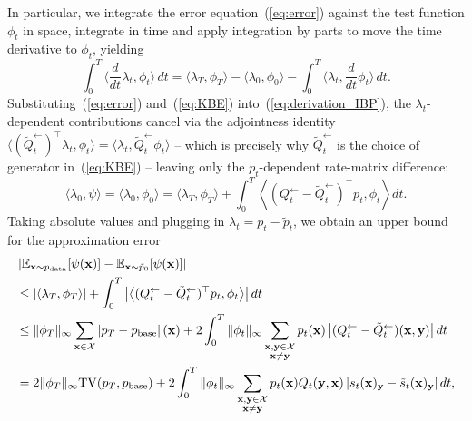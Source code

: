 \documentclass{article} %
\def\eqref#1{equation~\ref{#1}}
\newcommand{\bfx}{{\bf x}}
\newcommand{\bfy}{ {\bf y}}
\newcommand{\TV}{\mathrm{TV}}
\renewcommand{\eqref}[1]{\textup{(\ref{#1})}}
\begin{document}
In particular, we integrate the error equation~\eqref{eq:error} against the test function $\phi_t$ in space, integrate in time and apply integration by parts to move the time derivative to $\phi_t$, yielding
\begin{equation}\label{eq:derivation_IBP}
\int_0^T \langle \frac{d}{dt} \lambda_t, \phi_t \rangle \, dt = \langle \lambda_T, \phi_T \rangle - \langle \lambda_0, \phi_0 \rangle - \int_0^T \langle \lambda_t, \frac{d}{dt} \phi_t \rangle \, dt.
\end{equation}
Substituting~\eqref{eq:error} and~\eqref{eq:KBE} into~\eqref{eq:derivation_IBP}, the $\lambda_t$-dependent contributions cancel via the adjointness identity $\langle (\tilde{Q}_t^{\leftarrow})^\top \lambda_t, \phi_t \rangle = \langle \lambda_t, \tilde{Q}_t^{\leftarrow} \phi_t \rangle$ -- which is precisely why $\tilde{Q}_t^{\leftarrow}$ is the choice of generator in~\eqref{eq:KBE} -- leaving only the $p_t$-dependent rate-matrix difference:
\begin{equation}
     \langle \lambda_0, \psi \rangle = \langle \lambda_0, \phi_0 \rangle = \langle \lambda_T, \phi_T \rangle + \int_0^T \left\langle (Q_{t}^{\leftarrow} - \tilde{Q}_{t}^{\leftarrow})^\top p_{t}  , \phi_t \right\rangle dt.
\end{equation}
Taking absolute values and plugging in $\lambda_t=p_t-\tilde{p}_t$, we obtain an upper bound for the approximation error
\begin{align}\label{eq:upper_bound_approximate}
\begin{split}
     &\left| \mathbb{E}_{\bfx \sim p_{\mathrm{data}}}[\psi(\bfx)] - \mathbb{E}_{\bfx \sim \tilde{p}_0}[\psi(\bfx)] \right| \\
     &\leq \left| \langle \lambda_T, \phi_T \rangle \right| +   \int_0^T \left|\left\langle (Q_{t}^{\leftarrow} - \tilde{Q}_{t}^{\leftarrow})^\top p_{t}  , \phi_t \right\rangle \right| dt  \\
     &\leq \| \phi_T \|_\infty \sum_{\bfx\in\mathcal{X}} \left|p_T - p_{\rm base} \right| (\bfx) + 2 \int_0^T \| \phi_t \|_\infty \sum_{\substack{\bfx,\bfy\in\mathcal{X} \\ \bfx\neq \bfy}}   p_t(\bfx) \left|
      (Q_{t}^{\leftarrow} - \tilde{Q}_{t}^{\leftarrow}) (\bfx, \bfy) \right| dt \\
      &= 2 \| \phi_T \|_\infty \TV(p_T, p_{\rm base}) + 2 \int_0^T \| \phi_t \|_\infty \sum_{\substack{\bfx,\bfy\in\mathcal{X} \\ \bfx\neq \bfy}}  p_t(\bfx) Q_t(\bfy, \bfx) \left| {s}_t(\bfx)_\bfy - \tilde{s}_t(\bfx)_\bfy  \right|  dt,
\end{split}
\end{align}
\end{document}
